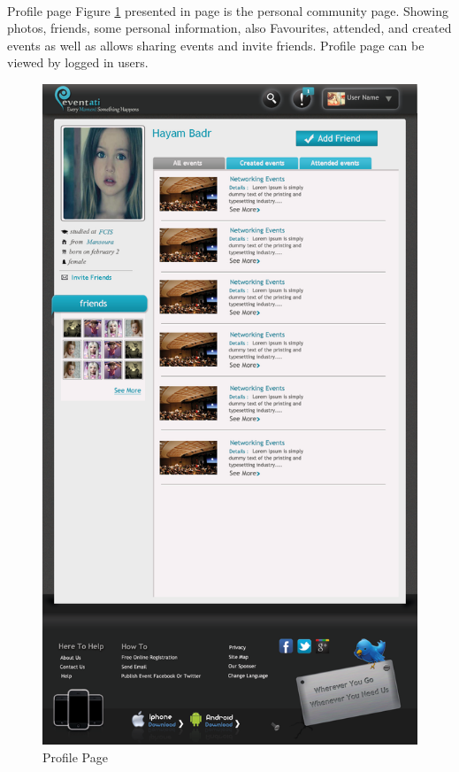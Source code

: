 \documentclass[12pt,a4paper,class,twoside,openany]{report}
\begin{document}
{ \paragraph*{\hspace{.9 cm} } Profile page Figure \ref{fg:6-11} presented in page \pageref{fg:6-11} is the personal community page.  Showing photos, friends, some personal information, also Favourites, attended, and created events as well as allows sharing events and invite friends. Profile page can be viewed by logged in users.
 \begin{figure}
\begin{center}
\includegraphics[height=8.10 in]{6-11}
\caption{Profile Page}
\label{fg:6-11}
\end{center}
\end{figure}
}
\end{document}
